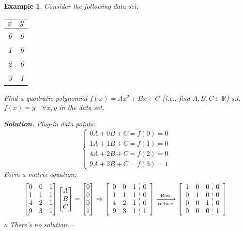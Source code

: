 \documentclass[12pt, a4paper]{article}
\newtheorem{eg}{Example}[subsection]
\newenvironment*{sol}{\par\indent\textbf{\textit{Solution. }}}{\hfill{$\square$}\par}
\def\R{{\mathbb{R}}}
\def\C{{\mathbb{C}}}
\begin{document}
\begin{eg}\label{eg5.3.2}
	Consider the following data set: 
	\begin{center}\begin{tabular}{c|c}$x$&$y$\\\hline0&0\\1&0\\2&0\\3&1\end{tabular}\end{center} Find a quadratic polynomial $f(x)=Ax^2+Bx+C$ (i.e., find $A,B,C\in\R$) \emph{s.t.} $f(x)=y\quad\forall x,y$ in the data set.\\ 
	\begin{sol}
		Plug-in data points: \[\begin{cases}0A+0B+C=f(0)=0\\1A+1B+C=f(1)=0\\4A+2B+C=f(2)=0\\9A+3B+C=f(3)=1\end{cases}\]
		Form a matrix equation: \[\begin{bmatrix}0&0&1\\1&1&1\\4&2&1\\9&3&1\end{bmatrix}\begin{bmatrix}A\\B\\C\end{bmatrix}=\begin{bmatrix}0\\0\\0\\1\end{bmatrix}\Rightarrow\left[\begin{array}{c:c}\begin{matrix}0&0&1\\1&1&1\\4&2&1\\9&3&1\end{matrix}&\begin{matrix}0\\0\\0\\1\end{matrix}\end{array}\right]\xrightarrow[\text{reduce}]{\text{Row}}\left[\begin{array}{c:c}\begin{matrix}1&0&0\\0&1&0\\0&0&1\\0&0&0\end{matrix}&\begin{matrix}0\\0\\0\\1\end{matrix}\end{array}\right]\]
		$\therefore$ There's no solution.
	\end{sol}
\end{eg}
\end{document}

